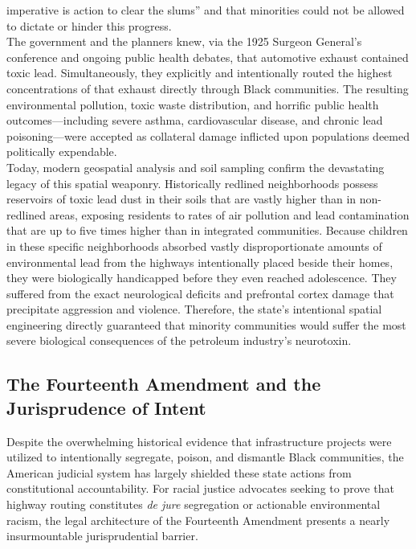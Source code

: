 \documentclass[
]{article}
\begin{document}
imperative is action to clear the slums'' and that minorities could not
be allowed to dictate or hinder this progress.\\
The government and the planners knew, via the 1925 Surgeon General's
conference and ongoing public health debates, that automotive exhaust
contained toxic lead. Simultaneously, they explicitly and intentionally
routed the highest concentrations of that exhaust directly through Black
communities. The resulting environmental pollution, toxic waste
distribution, and horrific public health outcomes---including severe
asthma, cardiovascular disease, and chronic lead poisoning---were
accepted as collateral damage inflicted upon populations deemed
politically expendable.\\
Today, modern geospatial analysis and soil sampling confirm the
devastating legacy of this spatial weaponry. Historically redlined
neighborhoods possess reservoirs of toxic lead dust in their soils that
are vastly higher than in non-redlined areas, exposing residents to
rates of air pollution and lead contamination that are up to five times
higher than in integrated communities. Because children in these
specific neighborhoods absorbed vastly disproportionate amounts of
environmental lead from the highways intentionally placed beside their
homes, they were biologically handicapped before they even reached
adolescence. They suffered from the exact neurological deficits and
prefrontal cortex damage that precipitate aggression and violence.
Therefore, the state's intentional spatial engineering directly
guaranteed that minority communities would suffer the most severe
biological consequences of the petroleum industry's neurotoxin.

\subsection{\texorpdfstring{\textbf{The Fourteenth Amendment and the
Jurisprudence of
Intent}}{The Fourteenth Amendment and the Jurisprudence of Intent}}\label{the-fourteenth-amendment-and-the-jurisprudence-of-intent}

Despite the overwhelming historical evidence that infrastructure
projects were utilized to intentionally segregate, poison, and dismantle
Black communities, the American judicial system has largely shielded
these state actions from constitutional accountability. For racial
justice advocates seeking to prove that highway routing constitutes
\emph{de jure} segregation or actionable environmental racism, the legal
architecture of the Fourteenth Amendment presents a nearly
insurmountable jurisprudential barrier.
\end{document}
